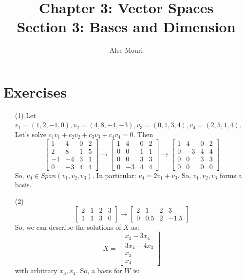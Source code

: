 \documentclass[12pt]{article}
\begin{document}
\title{Chapter 3: Vector Spaces \\ Section 3: Bases and Dimension}
\author{Alec Mouri}

\maketitle
\section*{Exercises}
\begin{itemize}
\item[(1)]
Let $v_1 = (1, 2, -1, 0), v_2 = (4, 8, -4, -3), v_3 = (0, 1, 3, 4), v_4 = (2, 5, 1, 4)$. Let's solve $c_1v_1 + c_2v_2 + c_3v_3 + c_4v_4 = 0$. Then
$$\begin{bmatrix}
1 & 4 & 0 & 2 \\
2 & 8 & 1 & 5 \\
-1 & -4 & 3 & 1 \\
0 & -3 & 4 & 4
\end{bmatrix} \rightarrow \begin{bmatrix}
1 & 4 & 0 & 2 \\
0 & 0 & 1 & 1 \\
0 & 0 & 3 & 3 \\
0 & -3 & 4 & 4
\end{bmatrix} \rightarrow \begin{bmatrix}
1 & 4 & 0 & 2 \\
0 & -3 & 4 & 4 \\
0 & 0 & 3 & 3 \\
0 & 0 & 0 & 0
\end{bmatrix}$$
So, $v_4 \in Span(v_1, v_2, v_3)$. In particular: $v_4 = 2v_1 + v_3$. So, $v_1, v_2, v_3$ forms a basis.
\item[(2)]
$$\begin{bmatrix}
2 & 1 & 2 & 3 \\
1 & 1 & 3 & 0
\end{bmatrix} \rightarrow \begin{bmatrix}
2 & 1 & 2 & 3 \\
0 & 0.5 & 2 & -1.5
\end{bmatrix}$$
So, we can describe the solutions of $X$ as:
$$X = \begin{bmatrix}
x_3 - 3x_4 \\
3x_4 - 4x_3 \\
x_3 \\
x_4
\end{bmatrix}$$
with arbitrary $x_3, x_4$. So, a basis for $W$ is:

\end{itemize}
\end{document}
